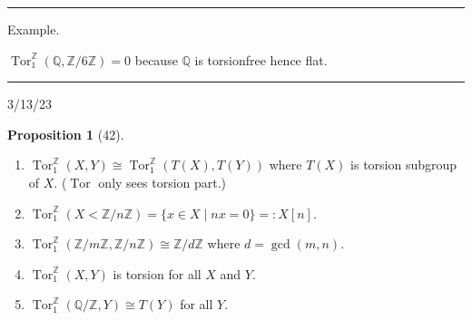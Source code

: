 \documentclass[12pt]{article}
\newcommand{\sepline}{\rule{\textwidth}{0.4pt}}
\theoremstyle{definition}
\newtheorem{proposition}{Proposition}
\newcommand{\Z}{\mathbb{Z}}
\newcommand{\Q}{\mathbb{Q}}
\newcommand{\<}{\left\langle}
\renewcommand{\>}{\right\rangle}
\newcommand{\iso}{\cong}
\DeclareMathOperator{\Tor}{Tor}
\renewcommand{\_}[1]{{_{#1}}}
\begin{document}
\sepline

Example.

$\Tor_1^\Z(\Q, \Z/6\Z) = 0$ because $\Q$ is torsionfree hence flat.


\sepline

3/13/23


\begin{proposition}[42]
    \
    \begin{enumerate}[(1)]
        \item $\Tor_1^\Z(X, Y) \iso \Tor_1^\Z(T(X), T(Y))$ where $T(X)$ is torsion subgroup of $X$.
        ($\Tor$ only sees torsion part.)
        \item $\Tor_1^\Z(X< \Z/n\Z) = \{x \in X \mid nx = 0\} =: X[n]$.
        \item $\Tor_1^\Z(\Z/m\Z, \Z/n\Z) \iso \Z/d\Z$ where $d = \gcd(m, n)$.
        \item $\Tor_1^\Z(X, Y)$ is torsion for all $X$ and $Y$.
        \item $\Tor_1^\Z(\Q/\Z, Y) \iso T(Y)$ for all $Y$.
    \end{enumerate}
\end{proposition}
\end{document}
